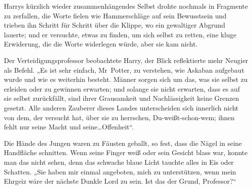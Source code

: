 Harrys kürzlich wieder zusammenhängendes Selbst drohte nochmals in Fragmente zu zerfallen, die Worte fielen wie Hammerschläge auf sein Bewusstsein und trieben ihn Schritt für Schritt über die Klippe, wo ein gewaltiger Abgrund lauerte; und er versuchte, etwas zu finden, um sich selbst zu retten, eine kluge Erwiderung, die die Worte widerlegen würde, aber sie kam nicht.

Der Verteidigungsprofessor beobachtete Harry, der Blick reflektierte mehr Neugier als Befehl. „Es ist sehr einfach, Mr~Potter, zu verstehen, wie Askaban aufgebaut wurde und wie es weiterhin besteht. Männer sorgen sich um das, was sie selbst zu erleiden oder zu gewinnen erwarten; und solange sie nicht erwarten, dass es auf sie selbst zurückfällt, sind ihrer Grausamkeit und Nachlässigkeit keine Grenzen gesetzt. Alle anderen Zauberer dieses Landes unterscheiden sich innerlich nicht von dem, der versucht hat, über sie zu herrschen, Du-weißt-schon-wem; ihnen fehlt nur seine Macht und seine…Offenheit“.

Die Hände des Jungen waren zu Fäusten geballt, so fest, dass die Nägel in seine Handfläche schnitten. Wenn seine Finger weiß oder sein Gesicht blass war, konnte man das nicht sehen, denn das schwache blaue Licht tauchte alles in Eis oder Schatten. „Sie haben mir einmal angeboten, mich zu unterstützen, wenn mein Ehrgeiz wäre der nächste Dunkle Lord zu sein. Ist das der Grund, Professor?“

